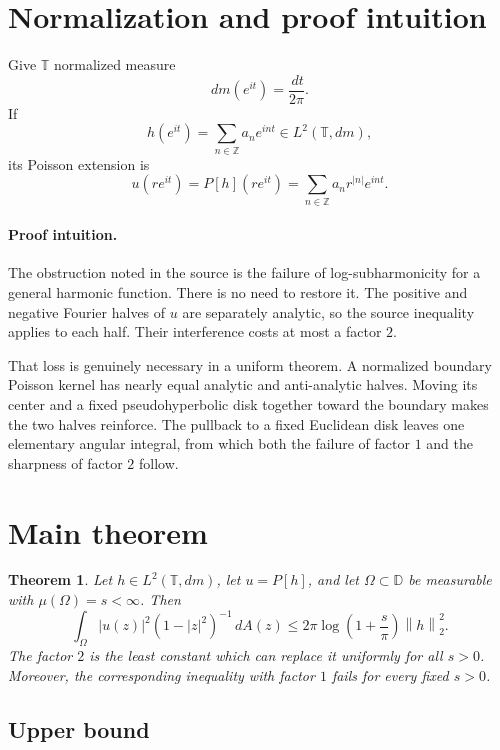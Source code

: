 \documentclass[11pt]{article}
\newtheorem{theorem}{Theorem}
\newcommand{\D}{\mathbb D}
\newcommand{\T}{\mathbb T}
\newcommand{\dd}{\,d}
\newcommand{\norm}[1]{\left\lVert#1\right\rVert}
\begin{document}
\section{Normalization and proof intuition}

Give \(\T\) normalized measure
\[
 dm(e^{it})=\frac{\dd t}{2\pi}.
\]
If
\[
 h(e^{it})=\sum_{n\in\mathbb Z}a_ne^{int}\in L^2(\T,dm),
\]
its Poisson extension is
\[
 u(re^{it})=P[h](re^{it})
 =\sum_{n\in\mathbb Z}a_nr^{|n|}e^{int}.
\]

\paragraph{Proof intuition.}
The obstruction noted in the source is the failure of log-subharmonicity for
a general harmonic function. There is no need to restore it. The positive and
negative Fourier halves of \(u\) are separately analytic, so the source
inequality applies to each half. Their interference costs at most a factor
\(2\).

That loss is genuinely necessary in a uniform theorem. A normalized boundary
Poisson kernel has nearly equal analytic and anti-analytic halves. Moving its
center and a fixed pseudohyperbolic disk together toward the boundary makes
the two halves reinforce. The pullback to a fixed Euclidean disk leaves one
elementary angular integral, from which both the failure of factor \(1\) and
the sharpness of factor \(2\) follow.

\section{Main theorem}

\begin{theorem}\label{thm:main}
Let \(h\in L^2(\T,dm)\), let \(u=P[h]\), and let
\(\Omega\subset\D\) be measurable with \(\mu(\Omega)=s<\infty\). Then
\begin{equation}\label{eq:main}
 \int_\Omega |u(z)|^2(1-|z|^2)^{-1}\dd A(z)
 \le
 2\pi\log\!\left(1+\frac{s}{\pi}\right)\norm{h}_2^2.
\end{equation}
The factor \(2\) is the least constant which can replace it uniformly for all
\(s>0\). Moreover, the corresponding inequality with factor \(1\) fails for
every fixed \(s>0\).
\end{theorem}

\subsection{Upper bound}
\end{document}
